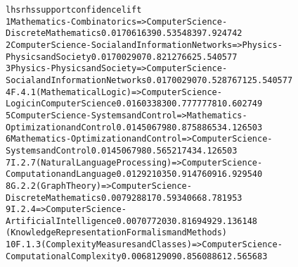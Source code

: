 \begin{alltt}\tiny
lhs                                                   rhs                                                      support      confidence       lift
1  {Mathematics-Combinatorics}                         => {Computer Science - Discrete Mathematics}             0.017061639  0.5354839   7.924742
2  {Computer Science-Social and Information Networks}  => {Physics - Physics and Society}                       0.017002907  0.8212766  25.540577
3  {Physics-Physics and Society}                       => {Computer Science - Social and Information Networks}  0.017002907  0.5287671  25.540577
4  {F.4.1} (Mathematical Logic)                        => {Computer Science - Logic in Computer Science}        0.016033830  0.7777778  10.602749
5  {Computer Science-Systems and Control}              => {Mathematics - Optimization and Control}              0.014506798  0.8758865  34.126503
6  {Mathematics-Optimization and Control}              => {Computer Science - Systems and Control}              0.014506798  0.5652174  34.126503
7  {I.2.7} (Natural Language Processing)               => {Computer Science - Computation and Language}         0.012921035  0.9147609  16.929540
8  {G.2.2} (Graph Theory)                              => {Computer Science - Discrete Mathematics}             0.007928817  0.5934066   8.781953
9  {I.2.4}                                             => {Computer Science - Artificial Intelligence}          0.007077203  0.8169492   9.136148
(Knowledge Representation Formalism and Methods)
10 {F.1.3} (Complexity Measures and Classes)           => {Computer Science - Computational Complexity}         0.006812909  0.8560886  12.565683
\end{alltt}

